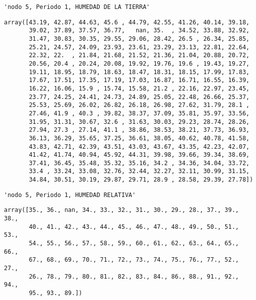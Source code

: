 \documentclass[11pt]{article}
\begin{document}
    
    
    \begin{verbatim}
'nodo 5, Periodo 1, HUMEDAD DE LA TIERRA'
    \end{verbatim}

    
    
    \begin{verbatim}
array([43.19, 42.87, 44.63, 45.6 , 44.79, 42.55, 41.26, 40.14, 39.18,
       39.02, 37.89, 37.57, 36.77,   nan, 35.  , 34.52, 33.88, 32.92,
       31.47, 30.83, 30.35, 29.55, 29.06, 28.42, 26.5 , 26.34, 25.85,
       25.21, 24.57, 24.09, 23.93, 23.61, 23.29, 23.13, 22.81, 22.64,
       22.32, 22.  , 21.84, 21.68, 21.52, 21.36, 21.04, 20.88, 20.72,
       20.56, 20.4 , 20.24, 20.08, 19.92, 19.76, 19.6 , 19.43, 19.27,
       19.11, 18.95, 18.79, 18.63, 18.47, 18.31, 18.15, 17.99, 17.83,
       17.67, 17.51, 17.35, 17.19, 17.03, 16.87, 16.71, 16.55, 16.39,
       16.22, 16.06, 15.9 , 15.74, 15.58, 21.2 , 22.16, 22.97, 23.45,
       23.77, 24.25, 24.41, 24.73, 24.89, 25.05, 22.48, 26.66, 25.37,
       25.53, 25.69, 26.02, 26.82, 26.18, 26.98, 27.62, 31.79, 28.1 ,
       27.46, 41.9 , 40.3 , 39.82, 38.37, 37.09, 35.81, 35.97, 33.56,
       31.95, 31.31, 30.67, 32.6 , 31.63, 30.03, 29.23, 28.74, 28.26,
       27.94, 27.3 , 27.14, 41.1 , 38.86, 38.53, 38.21, 37.73, 36.93,
       36.13, 36.29, 35.65, 37.25, 36.61, 38.05, 40.62, 40.78, 41.58,
       43.83, 42.71, 42.39, 43.51, 43.03, 43.67, 43.35, 42.23, 42.07,
       41.42, 41.74, 40.94, 45.92, 44.31, 39.98, 39.66, 39.34, 38.69,
       37.41, 36.45, 35.48, 35.32, 35.16, 34.2 , 34.36, 34.04, 33.72,
       33.4 , 33.24, 33.08, 32.76, 32.44, 32.27, 32.11, 30.99, 31.15,
       34.84, 30.51, 30.19, 29.87, 29.71, 28.9 , 28.58, 29.39, 27.78])
    \end{verbatim}

    
    
    \begin{verbatim}
'nodo 5, Periodo 1, HUMEDAD RELATIVA'
    \end{verbatim}

    
    
    \begin{verbatim}
array([35., 36., nan, 34., 33., 32., 31., 30., 29., 28., 37., 39., 38.,
       40., 41., 42., 43., 44., 45., 46., 47., 48., 49., 50., 51., 53.,
       54., 55., 56., 57., 58., 59., 60., 61., 62., 63., 64., 65., 66.,
       67., 68., 69., 70., 71., 72., 73., 74., 75., 76., 77., 52., 27.,
       26., 78., 79., 80., 81., 82., 83., 84., 86., 88., 91., 92., 94.,
       95., 93., 89.])
    \end{verbatim}
\end{document}
